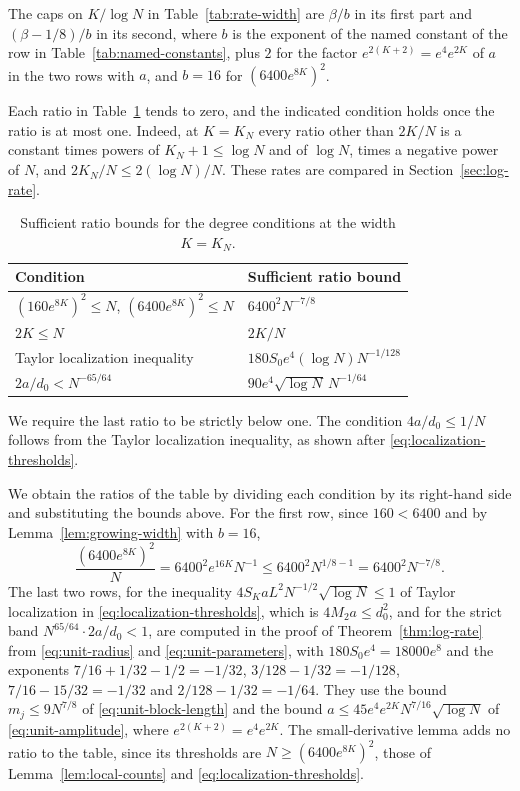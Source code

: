 The caps on $K/\log N$ in Table~\ref{tab:rate-width} are $\beta/b$ in
its first part and $(\beta-1/8)/b$ in its second, where $b$ is the
exponent of the named constant of the row in
Table~\ref{tab:named-constants}, plus $2$ for the factor
$e^{2(K+2)}=e^4e^{2K}$ of $a$ in the two rows with $a$, and $b=16$ for
$(6400e^{8K})^2$.

Each ratio in Table~\ref{tab:growing-annulus} tends to zero, and the
indicated condition holds once the ratio is at most one.
Indeed, at $K=K_N$ every ratio other than $2K/N$ is a constant times
powers of $K_N+1\le\log N$ and of $\log N$, times a negative power of
$N$, and $2K_N/N\le2(\log N)/N$. These rates are compared in
Section~\ref{sec:log-rate}.
\begin{table}[!htbp]
\centering
\small
\begin{tabular}{>{\raggedright\arraybackslash}p{}p{}}
\toprule
Condition & Sufficient ratio bound\\
\midrule
$(160e^{8K})^2\le N$, $(6400e^{8K})^2\le N$ & $6400^2N^{-7/8}$\\
$2K\le N$ & $2K/N$\\
Taylor localization inequality
 & $180S_0e^4(\log N)N^{-1/128}$\\
$2a/d_0<N^{-65/64}$
 & $90e^4\sqrt{\log N}\,N^{-1/64}$\\
\bottomrule
\end{tabular}
\caption{Sufficient ratio bounds for the degree conditions at the width
$K=K_N$.}
\label{tab:growing-annulus}
\end{table}
We require the last ratio to be strictly below one. The condition
$4a/d_0\le1/N$ follows from the Taylor localization inequality, as shown
after \eqref{eq:localization-thresholds}.

We obtain the ratios of the table by dividing each condition by its
right-hand side and substituting the bounds above. For the first row,
since $160<6400$ and by Lemma~\ref{lem:growing-width} with $b=16$,
\[
 \frac{(6400e^{8K})^2}N=6400^2e^{16K}N^{-1}\le6400^2N^{1/8-1}
 =6400^2N^{-7/8}.
\]
The last two rows, for the inequality
$4S_KaL^2N^{-1/2}\sqrt{\log N}\le1$ of Taylor localization in
\eqref{eq:localization-thresholds}, which is $4M_2a\le d_0^2$, and for
the strict band $N^{65/64}\cdot2a/d_0<1$, are computed in the proof of
Theorem~\ref{thm:log-rate} from \eqref{eq:unit-radius} and
\eqref{eq:unit-parameters}, with $180S_0e^4=18000e^8$ and the
exponents $7/16+1/32-1/2=-1/32$, $3/128-1/32=-1/128$,
$7/16-15/32=-1/32$ and $2/128-1/32=-1/64$. They use the bound
$m_j\le9N^{7/8}$ of \eqref{eq:unit-block-length} and the bound
$a\le45e^4e^{2K}N^{7/16}\sqrt{\log N}$ of \eqref{eq:unit-amplitude},
where $e^{2(K+2)}=e^4e^{2K}$.
The small-derivative lemma adds no ratio to the table, since its
thresholds are $N\ge(6400e^{8K})^2$, those of
Lemma~\ref{lem:local-counts} and \eqref{eq:localization-thresholds}.

